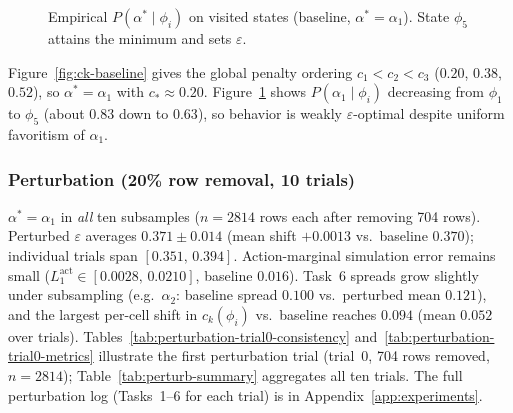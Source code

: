 \documentclass[11pt,a4paper]{article}
\begin{document}
\begin{figure}[H]
  \centering
  \caption{Empirical $P(\alpha^\ast\mid\phi_i)$ on visited states (baseline,
    $\alpha^\ast=\alpha_1$). State $\phi_5$ attains the minimum and sets
    $\varepsilon$.}
  \label{fig:policy-alpha}
\end{figure}

Figure~\ref{fig:ck-baseline} gives the global penalty ordering $c_1<c_2<c_3$
($0.20$, $0.38$, $0.52$), so $\alpha^\ast=\alpha_1$ with $c_\ast\approx 0.20$.
Figure~\ref{fig:policy-alpha} shows $P(\alpha_1\mid\phi_i)$ decreasing from
$\phi_1$ to $\phi_5$ (about $0.83$ down to $0.63$), so behavior is weakly
$\varepsilon$-optimal despite uniform favoritism of $\alpha_1$.

\subsubsection{Perturbation (20\% row removal, 10 trials)}\label{sec:perturbation-results}

$\alpha^\ast=\alpha_1$ in \emph{all} ten subsamples ($n=2814$ rows each after
removing 704 rows). Perturbed $\varepsilon$ averages $0.371\pm0.014$ (mean shift
$+0.0013$ vs.\ baseline $0.370$); individual trials span $[0.351,\,0.394]$.
Action-marginal simulation error remains small ($L_1^{\mathrm{act}}\in[0.0028,\,0.0210]$,
baseline $0.016$). Task~6 spreads grow slightly under subsampling (e.g.\
$\alpha_2$: baseline spread $0.100$ vs.\ perturbed mean $0.121$), and the largest
per-cell shift in $c_k(\phi_i)$ vs.\ baseline reaches $0.094$ (mean $0.052$ over
trials).
Tables~\ref{tab:perturbation-trial0-consistency} and~\ref{tab:perturbation-trial0-metrics}
illustrate the first perturbation trial (trial~0, 704 rows removed, $n=2814$);
Table~\ref{tab:perturb-summary} aggregates all ten trials.
The full perturbation log (Tasks~1--6 for each trial) is in Appendix~\ref{app:experiments}.
\end{document}
